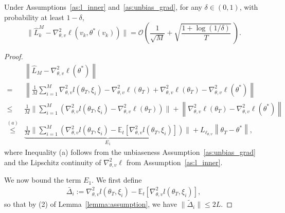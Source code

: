 \documentclass[11 pt]{article}
\begin{document}
\begin{lemma}\label{lemma:l_21_approx_practical}
Under Assumptions~\ref{as:l_inner} and~\ref{as:unbias_grad}, for any 
$\delta\in(0,1)$, with probability at least $1-\delta$,
\[
\|\hat{L}_k^M - \nabla_{\theta,v}^2 \ell(v_k,\theta^*(v_k))\|
=
\mathcal{O}\!\left(\frac{1}{\sqrt{M}}+
\sqrt{\frac{1+\log(1/\delta)}{T}}
\
\right).
\]
\end{lemma}

\begin{proof}\label{app:proof_l_21_approx_practical}
\begin{align*}
    & \left\|\hat{L}_M - \nabla_{\theta,v}^2\ell(\theta^*) \right\|\\
    = &\left\| \frac1M\sum_{i=1}^{M} \nabla_{\theta,v}^2l(\theta_T,\xi_i)-\nabla_{\theta,v}^2\ell(\theta_T)+\nabla_{\theta,v}^2\ell(\theta_T)-\nabla_{\theta,v}^2\ell(\theta^*)\right\|\\
    \leq & \frac1M\Bigg\| \sum_{i=1}^{M}\left(\nabla_{\theta,v}^2l(\theta_T,\xi_i)-\nabla_{\theta,v}^2\ell(\theta_T)\right)\Bigg\|+\left\|\nabla_{\theta,v}^2\ell(\theta_T)-\nabla_{\theta,v}^2\ell(\theta^*) \right\|\\
    \overset{(a)}{\leq} & \underbrace{\frac1M\Bigg\| \sum_{i=1}^{M}\left(\nabla_{\theta,v}^2l(\theta_T,\xi_i)-\mathbb{E}_t[\nabla_{\theta,v}^2l(\theta_T, \xi_i)]\right)\Bigg\|}_{E_1}+L_{\ell_{\theta,v}}\left\|\theta_T-\theta^*\right\|,
\end{align*}
where Inequality (a) follows from the unbiaseness Assumption~\ref{as:unbias_grad} and the Lipschitz continuity of $\nabla_{\theta,v}^2\ell$ from Assumption~\ref{as:l_inner}.

We now bound the term $E_1$. We first define
\begin{align*}
\bar{\Delta}_i:= \nabla_{\theta,v}^2l(\theta_T, \xi_i)-\mathbb{E}_t[\nabla_{\theta,v}^2l(\theta_T, \xi_i)],
\end{align*}
so that by (2) of Lemma~\ref{lemma:assumption}, we have $\|\tilde{\Delta}_i\| \leq 2L.$


\end{proof}
\end{document}
